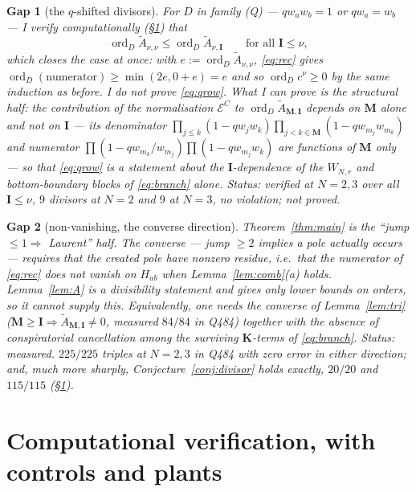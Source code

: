 \documentclass[11pt]{article}
\theoremstyle{plain}
\theoremstyle{definition}
\theoremstyle{remark}
\theoremstyle{plain}
\newtheorem{gapthm}{Gap}
\newcommand{\bI}{\mathbf{I}}
\newcommand{\bM}{\mathbf{M}}
\newcommand{\bK}{\mathbf{K}}
\newcommand{\At}{\widetilde{A}}
\newcommand{\ord}{\operatorname{ord}}
\begin{document}
\begin{gapthm}[the $q$-shifted divisors]\label{gap:q}
For $D$ in family (Q) --- $qw_aw_b=1$ or $qw_a=w_b$ --- I verify
computationally (\S\ref{sec:verif}) that
\begin{equation}
\ord_D\At_{\nu,\nu}\le\ord_D\At_{\nu,\bI}\qquad\text{for all }\bI\le\nu,
\label{eq:qrow}
\end{equation}
which closes the case at once: with $e:=\ord_D\At_{\nu,\nu}$, \eqref{eq:rec}
gives $\ord_D(\text{numerator})\ge\min(2e,0+e)=e$ and so
$\ord_Dc^{\nu}\ge0$ by the same induction as before.  I do \emph{not} prove
\eqref{eq:qrow}.  What I can prove is the structural half: the contribution of
the normalisation $\mathcal{E}^C$ to $\ord_D\At_{\bM,\bI}$ depends on $\bM$
alone and not on $\bI$ --- its denominator
$\prod_{j\le k}(1-qw_jw_k)\prod_{j<k\in\bM}(1-qw_{m_j}w_{m_k})$ and numerator
$\prod(1-qw_{m_k}/w_{m_j})\prod(1-qw_{m_j}w_k)$ are functions of $\bM$ only ---
so that \eqref{eq:qrow} is a statement about the $\bI$-dependence of the
$W_{N,r}$ and bottom-boundary blocks of \eqref{eq:branch} alone.  Status:
verified at $N=2,3$ over all $\bI\le\nu$, $9$ divisors at $N=2$ and $9$ at
$N=3$, no violation; not proved.
\end{gapthm}

\begin{gapthm}[non-vanishing, the converse direction]\label{gap:nonvanishing}
Theorem~\ref{thm:main} is the ``jump $\le1\Rightarrow$ Laurent'' half.  The
converse --- jump $\ge2$ implies a pole \emph{actually occurs} --- requires that
the created pole have nonzero residue, i.e.\ that the numerator of
\eqref{eq:rec} does \emph{not} vanish on $H_{ab}$ when Lemma~\ref{lem:comb}(a)
holds.  Lemma~\ref{lem:A} is a divisibility statement and gives only lower
bounds on orders, so it cannot supply this.  Equivalently, one needs the
converse of Lemma~\ref{lem:tri} ($\bM\ge\bI\Rightarrow\At_{\bM,\bI}\ne0$,
measured $84/84$ in Q484) together with the absence of conspiratorial
cancellation among the surviving $\bK$-terms of \eqref{eq:branch}.
Status: measured.  $225/225$ triples at $N=2,3$ in Q484 with zero error in
either direction; and, much more sharply, Conjecture~\ref{conj:divisor} holds
exactly, $20/20$ and $115/115$ (\S\ref{sec:verif}).
\end{gapthm}

\section{Computational verification, with controls and plants}
\label{sec:verif}
\end{document}
